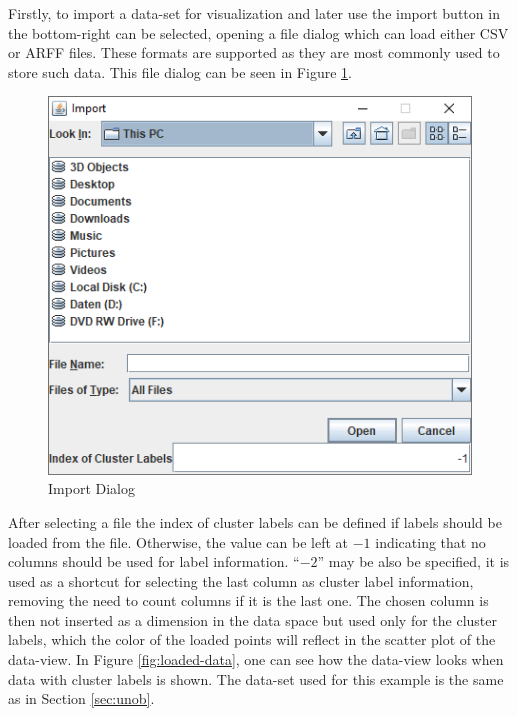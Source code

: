\documentclass[
	a4paper,
	english,
	twoside,
	openright,               
	11pt                            
	]{report}
\begin{document}
 Firstly, to import a data-set for visualization and later use the import button in the bottom-right can be selected, opening a file dialog which can load either CSV or ARFF files. These formats are supported as they are most commonly used to store such data. This file dialog can be seen in Figure \ref{fig:data-import}. 

\begin{figure}[h]
	\centering 
	\includegraphics[scale=.45]{data-import}%
	\caption{Import Dialog}
	\label{fig:data-import}
\end{figure}

After selecting a file the index of cluster labels can be defined if labels should be loaded from the file. Otherwise, the value can be left at $-1$ indicating that no columns should be used for label information. ``$-2$'' may be also be specified, it is used as a shortcut for selecting the last column as cluster label information, removing the need to count columns if it is the last one. The chosen column is then not inserted as a dimension in the data space but used only for the cluster labels, which the color of the loaded points will reflect in the scatter plot of the data-view. In Figure \ref{fig:loaded-data}, one can see how the data-view looks when data with cluster labels is shown. The data-set used for this example is the same as in Section \ref{sec:unob}.
\end{document}
